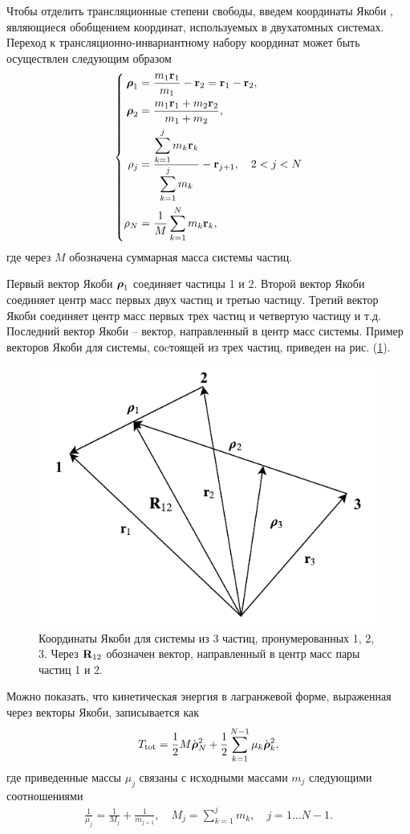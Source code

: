 Чтобы отделить трансляционные степени свободы, введем координаты Якоби \cite{greiner, littlejohn1995}, являющиеся обобщением координат, используемых в двухатомных системах. Переход к трансляционно-инвариантному набору координат может быть осуществлен следующим образом \cite{greiner}
\begin{gather}  
    \left\{
    \begin{aligned}
        \boldsymbol{\rho}_1 &= \frac{m_1 \mathbf{r}_1}{m_1} - \mathbf{r}_2 = \mathbf{r}_1 - \mathbf{r}_2, \\
        \boldsymbol{\rho}_2 &= \frac{m_1 \mathbf{r}_1 + m_2 \mathbf{r}_2}{m_1 + m_2}, \\
        \mathbf{\rho}_j &= \frac{\displaystyle \sum_{k = 1}^j m_k \mathbf{r}_k}{\displaystyle \sum_{k = 1}^j m_k} - \mathbf{r}_{j + 1}, \quad 2 < j < N \\
        \mathbf{\rho}_N &= \frac{1}{M} \sum_{k = 1}^N m_k \mathbf{r}_k,
    \end{aligned}
    \right.
\end{gather}
%
где через $M$ обозначена суммарная масса системы частиц. \par
Первый вектор Якоби $\boldsymbol{\rho}_1$ соединяет частицы 1 и 2. Второй вектор Якоби соединяет центр масс первых двух частиц и третью частицу. Третий вектор Якоби соединяет центр масс первых трех частиц и четвертую частицу и т.д. Последний вектор Якоби -- вектор, направленный в центр масс системы. Пример векторов Якоби для системы, соcтоящей из трех частиц, приведен на рис. (\ref{fig:jacobi_coordinates}). 

\begin{figure}
    \centering
    \includegraphics[width=0.5\linewidth]{pictures/jacobi_coordinates.pdf}
    \caption{Координаты Якоби  для системы из 3 частиц, пронумерованных 1, 2, 3. Через $\mathbf{R}_{12}$ обозначен вектор, направленный в центр масс пары частиц 1 и 2.}
    \label{fig:jacobi_coordinates}
\end{figure}

Можно показать, что кинетическая энергия в лагранжевой форме, выраженная через векторы Якоби, записывается как \cite{greiner} 
\begin{gather}
    T_\text{tot} = \frac{1}{2} M \dot{\boldsymbol{\rho}}_N^2 + \frac{1}{2} \sum_{k = 1}^{N - 1} \mu_k \dot{\boldsymbol{\rho}}_k^2,
\end{gather}
%
где приведенные массы $\mu_j$ связаны с исходными массами $m_j$ следующими соотношениями
\begin{gather}
    \frac{1}{\mu_j} = \frac{1}{M_j} + \frac{1}{m_{j+1}}, \quad M_j = \sum_{k = 1}^j m_k, \quad j = 1 \dots N - 1. \label{polyatom-jacobi-masses}
\end{gather}

